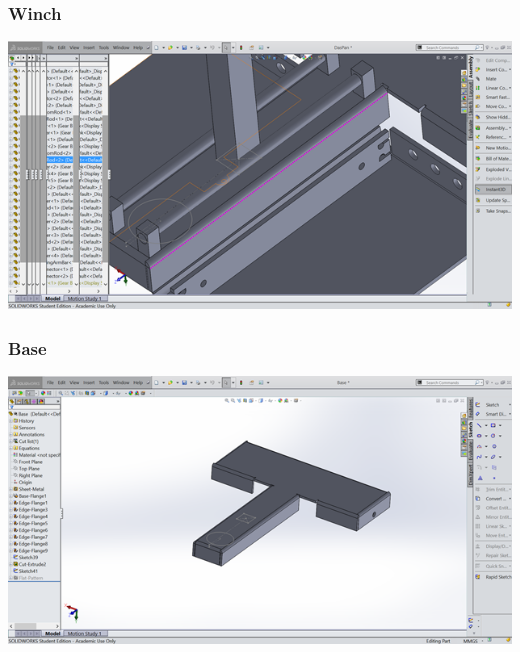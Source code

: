 \documentclass[12pt]{article}
\begin{document}
\subsubsection{Winch}
\includegraphics{winch}
\subsubsection{Base}
\includegraphics{base}
\end{document}
